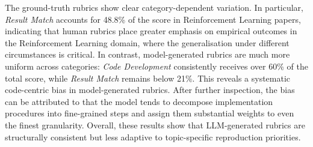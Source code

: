 \documentclass[11pt]{article}
\begin{document}
The ground-truth rubrics show clear category-dependent variation. In particular, \textit{Result Match} accounts for 48.8\% of the score in Reinforcement Learning papers, indicating that human rubrics place greater emphasis on empirical outcomes in the Reinforcement Learning domain, where the generalisation under different circumstances is critical. In contrast, model-generated rubrics are much more uniform across categories: \textit{Code Development} consistently receives over 60\% of the total score, while \textit{Result Match} remains below 21\%. This reveals a systematic code-centric bias in model-generated rubrics. After further inspection, the bias can be attributed to that the model tends to decompose implementation procedures into fine-grained steps and assign them substantial weights to even the finest granularity. Overall, these results show that LLM-generated rubrics are structurally consistent but less adaptive to topic-specific reproduction priorities.
\end{document}
